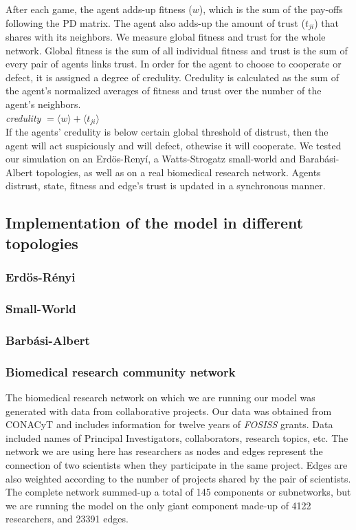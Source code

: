 After each game, the agent adds-up fitness ($w$), which is the sum of the
pay-offs following the PD matrix. The agent also adds-up the amount of
trust ($t_{ji}$) that shares with its neighbors. We measure global
fitness and trust for the whole network. Global fitness is the sum of
all individual fitness and trust is the sum of every pair of agents
links trust. In order for the agent to choose to cooperate
or defect, it is assigned a degree of credulity. Credulity is
calculated as the sum of the agent's normalized averages of fitness
and trust over the number of the agent's neighbors.\\


\textit{credulity} $= \langle w \rangle +  \langle t_{ji} \rangle$\\

If the agents' credulity is below certain global threshold of distrust, then
the agent will act suspiciously and will defect, othewise it will
cooperate. We tested our simulation on an Erd\"{o}s-Reny\'i, a
Watts-Strogatz small-world and Barab\'asi-Albert topologies, as well
as on a real biomedical research network. Agents distrust, state,
fitness and edge's trust is updated in a synchronous manner.   

\subsection{Implementation of the model in different topologies}

\subsubsection{Erd\"{o}s-R\'enyi}

\subsubsection{Small-World}

\subsubsection{Barb\'asi-Albert}

\subsubsection{Biomedical research community network}

The biomedical research network on which we are running our model
was generated with data from collaborative projects. Our data was
obtained from CONACyT and includes information for twelve years of
\textit{FOSISS} grants. Data included names of Principal
Investigators, collaborators, research topics, etc. The network we are
using here has researchers as nodes and edges represent the connection
of two scientists when they participate in the same project. Edges are
also weighted according to the number of projects shared by the pair
of scientists. The complete network summed-up a total of 145
components or subnetworks, but we are running the model on the only
giant component made-up of 4122 researchers, and 23391 edges.\\

